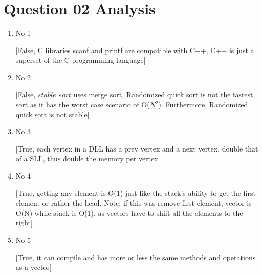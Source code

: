 \documentclass{article}
\begin{document}
\section{Question 02 Analysis}
\begin{enumerate}[label=(\arabic*)]

\item No 1

[False, C libraries scanf and printf are compatible with C++, C++ is just a superset of the C programming language]

\item No 2

[False, $stable\_sort$ uses merge sort, Randomized quick sort is not the fastest sort as it has the worst 
case scenario of O($N^2$). Furthermore, Randomized quick sort is not stable]

\item No 3

[True, each vertex in a DLL has a prev vertex and a next vertex, double that of a SLL, thus double the memory per vertex]

\item No 4

[True, getting any element is O(1) just like the stack's ability to get the first element or rather the head. Note: if this was remove first element, vector is O(N) while stack is O(1), as vectors have to shift all the elements to the right]

\item No 5

[True, it can compile and has more or less the same methods and operations as a vector]

\end{enumerate}
\end{document}
